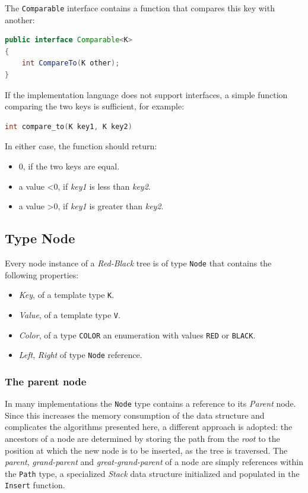 \documentclass{article}
\begin{document}
The \texttt{Comparable} interface contains a function that compares this key with another:
\begin{lstlisting}[language=java]
public interface Comparable<K>
{
    int CompareTo(K other);
}
\end{lstlisting}
If the implementation language does not support interfaces, a simple function comparing the two keys is sufficient,
for example:
\begin{lstlisting}[language=c]
int compare_to(K key1, K key2)
\end{lstlisting}
In either case, the function should return:
\begin{itemize}
    \item 0, if the two keys are equal.
    \item a value \textless0, if \emph{key1} is less than \emph{key2}.
    \item a value \textgreater0, if \emph{key1} is greater than \emph{key2}.
\end{itemize}

\subsection{Type Node}

Every node instance of a \emph{Red-Black} tree is of type \texttt{Node} that contains the following properties:
\begin{itemize}
    \item \emph{Key}, of a template type \texttt{K}.
    \item \emph{Value}, of a template type \texttt{V}.
    \item \emph{Color}, of a type \texttt{COLOR} an enumeration with values \texttt{RED} or \texttt{BLACK}.
    \item \emph{Left}, \emph{Right} of type \texttt{Node} reference.
\end{itemize}

\subsubsection{The parent node}

In many implementations the \texttt{Node} type contains a reference to its \emph{Parent} node.
Since this increases the memory consumption of the data structure and complicates the algorithms presented here,
a different approach is adopted: the ancestors of a node are determined by storing the path from the \emph{root} to the
position at which the new node is to be inserted, as the tree is traversed.
The \emph{parent}, \emph{grand-parent} and \emph{great-grand-parent} of a node are simply references within
the \texttt{Path} type, a specialized \emph{Stack} data structure initialized and populated in the \texttt{Insert}
function.
\end{document}
